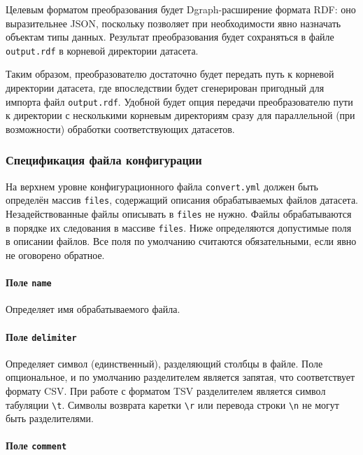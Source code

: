 Целевым форматом преобразования будет Dgraph-расширение формата RDF: оно выразительнее JSON,
поскольку позволяет при необходимости явно назначать объектам типы данных.
Результат преобразования будет сохраняться в файле \texttt{output.rdf} в корневой
директории датасета.

Таким образом, преобразователю достаточно будет передать путь к корневой директории датасета, где
впоследствии будет сгенерирован пригодный для импорта файл \texttt{output.rdf}. Удобной будет опция
передачи преобразователю пути к директории с несколькими корневым директориям сразу для параллельной
(при возможности) обработки соответствующих датасетов.


\subsubsection{Спецификация файла конфигурации} \label{configSpecs}

На верхнем уровне конфигурационного файла \texttt{convert.yml} должен быть определён массив
\texttt{files}, содержащий описания обрабатываемых файлов датасета. Незадействованные файлы
описывать в \texttt{files} не нужно. Файлы обрабатываются в порядке их следования в массиве
\texttt{files}. Ниже определяются допустимые поля в описании файлов. Все поля по умолчанию
считаются обязательными, если явно не оговорено обратное.

\paragraph{Поле \texttt{name}}

Определяет имя обрабатываемого файла.

\paragraph{Поле \texttt{delimiter}}

Определяет символ (единственный), разделяющий столбцы в файле. Поле опциональное, и по умолчанию
разделителем является запятая, что соответствует формату CSV. При работе с форматом TSV разделителем
является символ табуляции \texttt{\textbackslash t}. Символы возврата каретки \texttt{\textbackslash r}
или перевода строки \texttt{\textbackslash n} не могут быть разделителями.

\paragraph{Поле \texttt{comment}}

